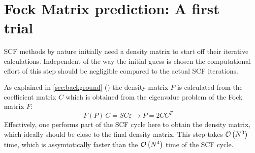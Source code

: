\chapter{Fock Matrix prediction: A first trial}
\label{chap:fock_matrix_predictions}

SCF methods by nature initially need a density matrix to start off their iterative calculations. Independent of the way the initial guess is chosen the computational effort of this step should be negligible compared to the actual SCF iterations. 

As explained in \autoref{sec:background} () the density matrix $P$ is calculated from the coefficient matrix $C$ which is obtained from the eigenvalue problem of the Fock matrix $F$:
\begin{equation}
    F(P)\,C = SC\varepsilon \rightarrow P = 2CC^T
\end{equation}
Effectively, one performs part of the SCF cycle here to obtain the density matrix, which ideally should be close to the final density matrix. This step takes $\mathcal{O}\left(N^3\right)$ time, which is assymtotically faster than the $\mathcal{O}\left(N^4\right)$ time of the SCF cycle. 


